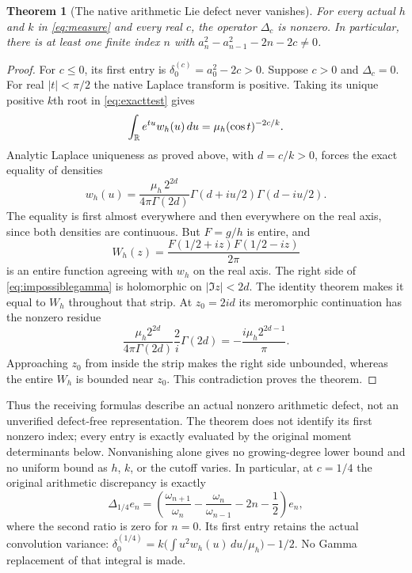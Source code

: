 \documentclass[11pt]{article}
\newtheorem{theorem}{Theorem}[section]
\begin{document}
\begin{theorem}[The native arithmetic Lie defect never vanishes]
\label{thm:nonzero}
For every actual $h$ and $k$ in \eqref{eq:measure} and every
real $c$, the operator $\Delta_c$ is nonzero. In particular,
there is at least one finite index $n$ with
$a_n^2-a_{n-1}^2-2n-2c\ne0$.
\end{theorem}
\begin{proof}
For $c\leq0$, its first entry is
$\delta_0^{(c)}=a_0^2-2c>0$.
Suppose $c>0$ and $\Delta_c=0$.
For real $|t|<\pi/2$ the native Laplace transform is positive.
Taking its unique positive $k$th root in
\eqref{eq:exacttest} gives
\[
 \int_\mathbb R e^{tu}w_h(u)\,du
       =\mu_h(\cos t)^{-2c/k}.
\]
Analytic Laplace uniqueness as proved above, with
$d=c/k>0$, forces the exact equality of densities
\begin{equation}\label{eq:impossiblegamma}
 w_h(u)=\frac{\mu_h\,2^{2d}}{4\pi\Gamma(2d)}
                \Gamma(d+iu/2)\Gamma(d-iu/2).
\end{equation}
The equality is first almost everywhere and then everywhere
on the real axis, since both densities are continuous.
But $F=g/h$ is entire, and
\[
 W_h(z)=\frac{F(1/2+iz)F(1/2-iz)}{2\pi}
\]
is an entire function agreeing with $w_h$ on the real axis.
The right side of \eqref{eq:impossiblegamma} is holomorphic
on $|\Im z|<2d$. The identity theorem makes it equal to
$W_h$ throughout that strip. At $z_0=2id$ its meromorphic
continuation has the nonzero residue
\[
 \frac{\mu_h2^{2d}}{4\pi\Gamma(2d)}
       \frac{2}{i}\Gamma(2d)
       =-\frac{i\mu_h2^{2d-1}}{\pi}.
\]
Approaching $z_0$ from inside the strip makes the right
side unbounded, whereas the entire $W_h$ is bounded near
$z_0$. This contradiction proves the theorem.
\end{proof}

Thus the receiving formulas describe an actual nonzero
arithmetic defect, not an unverified defect-free
representation. The theorem does not identify its first
nonzero index; every entry is exactly evaluated by the
original moment determinants below. Nonvanishing alone
gives no growing-degree lower bound and no uniform bound
as $h$, $k$, or the cutoff varies.
In particular, at $c=1/4$ the original arithmetic discrepancy
is exactly
\begin{equation}\label{eq:archdefect}
 \boxed{\quad
 \Delta_{1/4}e_n=
       \left(\frac{\omega_{n+1}}{\omega_n}
        -\frac{\omega_n}{\omega_{n-1}}-2n-\frac12\right)e_n,
 \quad}
\end{equation}
where the second ratio is zero for $n=0$.
Its first entry retains the actual convolution variance:
$\delta_0^{(1/4)}
 =k\bigl(\int u^2w_h(u)\,du/\mu_h\bigr)-1/2$.
No Gamma replacement of that integral is made.
\end{document}
